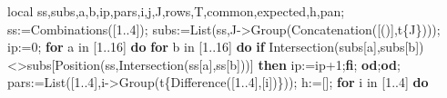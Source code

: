 \documentclass[
  10pt,
  letterpaper,
]{article}
\newenvironment{Shaded}{}{}
\newcommand{\BuiltInTok}[1]{\textcolor[rgb]{0.00,0.50,0.00}{#1}}
\newcommand{\ControlFlowTok}[1]{\textcolor[rgb]{0.00,0.44,0.13}{\textbf{#1}}}
\newcommand{\ExtensionTok}[1]{#1}
\newcommand{\FloatTok}[1]{\textcolor[rgb]{0.25,0.63,0.44}{#1}}
\newcommand{\NormalTok}[1]{#1}
\newcommand{\OperatorTok}[1]{\textcolor[rgb]{0.40,0.40,0.40}{#1}}
\newcommand{\VariableTok}[1]{\textcolor[rgb]{0.10,0.09,0.49}{#1}}
\begin{document}
\begin{Shaded}
\begin{Highlighting}[]
 \ExtensionTok{local} \VariableTok{ss}\OperatorTok{,}\VariableTok{subs}\OperatorTok{,}\VariableTok{a}\OperatorTok{,}\VariableTok{b}\OperatorTok{,}\VariableTok{ip}\OperatorTok{,}\VariableTok{pars}\OperatorTok{,}\VariableTok{i}\OperatorTok{,}\VariableTok{j}\OperatorTok{,}\VariableTok{J}\OperatorTok{,}\VariableTok{rows}\OperatorTok{,}\VariableTok{T}\OperatorTok{,}\VariableTok{common}\OperatorTok{,}\VariableTok{expected}\OperatorTok{,}\VariableTok{h}\OperatorTok{,}\VariableTok{pan}\OperatorTok{;}
 \VariableTok{ss}\OperatorTok{:=}\BuiltInTok{Combinations}\NormalTok{([}\FloatTok{1}\OperatorTok{..}\FloatTok{4}\NormalTok{])}\OperatorTok{;}
 \VariableTok{subs}\OperatorTok{:=}\BuiltInTok{List}\NormalTok{(}\VariableTok{ss}\OperatorTok{,}\VariableTok{J}\OperatorTok{{-}\textgreater{}}\BuiltInTok{Group}\NormalTok{(}\BuiltInTok{Concatenation}\NormalTok{([()]}\OperatorTok{,}\VariableTok{t}\NormalTok{\{}\VariableTok{J}\NormalTok{\})))}\OperatorTok{;}
 \VariableTok{ip}\OperatorTok{:=}\FloatTok{0}\OperatorTok{;}
 \ControlFlowTok{for} \VariableTok{a} \ExtensionTok{in}\NormalTok{ [}\FloatTok{1}\OperatorTok{..}\FloatTok{16}\NormalTok{] }\ControlFlowTok{do} \ControlFlowTok{for} \VariableTok{b} \ExtensionTok{in}\NormalTok{ [}\FloatTok{1}\OperatorTok{..}\FloatTok{16}\NormalTok{] }\ControlFlowTok{do}
  \ControlFlowTok{if} \BuiltInTok{Intersection}\NormalTok{(}\VariableTok{subs}\NormalTok{[}\VariableTok{a}\NormalTok{]}\OperatorTok{,}\VariableTok{subs}\NormalTok{[}\VariableTok{b}\NormalTok{])}\OperatorTok{\textless{}\textgreater{}}\VariableTok{subs}\NormalTok{[}\BuiltInTok{Position}\NormalTok{(}\VariableTok{ss}\OperatorTok{,}\BuiltInTok{Intersection}\NormalTok{(}\VariableTok{ss}\NormalTok{[}\VariableTok{a}\NormalTok{]}\OperatorTok{,}\VariableTok{ss}\NormalTok{[}\VariableTok{b}\NormalTok{]))]}
   \ControlFlowTok{then} \VariableTok{ip}\OperatorTok{:=}\VariableTok{ip}\OperatorTok{+}\FloatTok{1}\OperatorTok{;}\ControlFlowTok{fi}\OperatorTok{;}
 \ControlFlowTok{od}\OperatorTok{;}\ControlFlowTok{od}\OperatorTok{;}
 \VariableTok{pars}\OperatorTok{:=}\BuiltInTok{List}\NormalTok{([}\FloatTok{1}\OperatorTok{..}\FloatTok{4}\NormalTok{]}\OperatorTok{,}\VariableTok{i}\OperatorTok{{-}\textgreater{}}\BuiltInTok{Group}\NormalTok{(}\VariableTok{t}\NormalTok{\{}\BuiltInTok{Difference}\NormalTok{([}\FloatTok{1}\OperatorTok{..}\FloatTok{4}\NormalTok{]}\OperatorTok{,}\NormalTok{[}\VariableTok{i}\NormalTok{])\}))}\OperatorTok{;}
 \VariableTok{h}\OperatorTok{:=}\NormalTok{[]}\OperatorTok{;}
 \ControlFlowTok{for} \VariableTok{i} \ExtensionTok{in}\NormalTok{ [}\FloatTok{1}\OperatorTok{..}\FloatTok{4}\NormalTok{] }\ControlFlowTok{do}

\end{Highlighting}
\end{Shaded}
\end{document}
